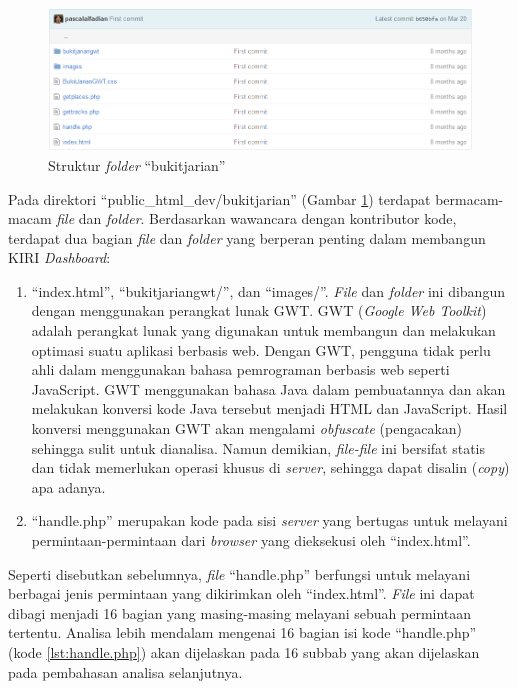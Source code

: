 \begin{figure}[htbp]
	\centering
		\includegraphics[scale=0.5]{Gambar/3_bukit_jarian.png}
	\caption{Struktur \textit{folder} ``bukitjarian''}
	\label{fig:3_bukit_jarian}
\end{figure}

Pada direktori ``public\_html\_dev/bukitjarian'' (Gambar \ref{fig:3_bukit_jarian}) terdapat bermacam-macam \textit{file} dan \textit{folder}. Berdasarkan wawancara dengan kontributor kode, terdapat dua bagian \textit{file} dan \textit{folder} yang berperan penting dalam membangun KIRI \textit{Dashboard}:
\begin{enumerate}
	\item ``index.html'', ``bukitjariangwt/'', dan ``images/''. \textit{File} dan \textit{folder} ini dibangun dengan menggunakan perangkat lunak GWT. GWT (\textit{Google Web Toolkit}) adalah perangkat lunak yang digunakan untuk membangun dan melakukan optimasi suatu aplikasi berbasis web\cite{gwt}. Dengan GWT, pengguna tidak perlu ahli dalam menggunakan bahasa pemrograman berbasis web seperti JavaScript. GWT menggunakan bahasa Java dalam pembuatannya dan akan melakukan konversi kode Java tersebut menjadi HTML dan JavaScript. Hasil konversi menggunakan GWT akan mengalami \textit{obfuscate} (pengacakan) sehingga sulit untuk dianalisa. Namun demikian, \textit{file-file} ini bersifat statis dan tidak memerlukan operasi khusus di \textit{server}, sehingga dapat disalin (\textit{copy}) apa adanya. 
	\item ``handle.php'' merupakan kode pada sisi \textit{server} yang bertugas untuk melayani permintaan-permintaan dari \textit{browser} yang dieksekusi oleh ``index.html''.
\end{enumerate}

Seperti disebutkan sebelumnya, \textit{file} ``handle.php'' berfungsi untuk melayani berbagai jenis permintaan yang dikirimkan oleh ``index.html''. \textit{File} ini dapat dibagi menjadi 16 bagian yang masing-masing melayani sebuah permintaan tertentu. Analisa lebih mendalam mengenai 16 bagian isi kode ``handle.php'' (kode \ref{lst:handle.php}) akan dijelaskan pada 16 subbab yang akan dijelaskan pada pembahasan analisa selanjutnya.

